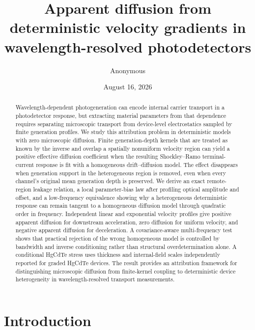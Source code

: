 \documentclass[aps,pra,twocolumn,superscriptaddress,nofootinbib]{revtex4-2}
\begin{document}
\title{Apparent diffusion from deterministic velocity gradients in wavelength-resolved photodetectors}

\author{Anonymous}

\date{August 16, 2026}

\begin{abstract}
Wavelength-dependent photogeneration can encode internal carrier transport in a photodetector response, but extracting material parameters from that dependence requires separating microscopic transport from device-level electrostatics sampled by finite generation profiles. We study this attribution problem in deterministic models with zero microscopic diffusion. Finite generation-depth kernels that are treated as known by the inverse and overlap a spatially nonuniform velocity region can yield a positive effective diffusion coefficient when the resulting Shockley--Ramo terminal-current response is fit with a homogeneous drift--diffusion model. The effect disappears when generation support in the heterogeneous region is removed, even when every channel's original mean generation depth is preserved. We derive an exact remote-region leakage relation, a local parameter-bias law after profiling optical amplitude and offset, and a low-frequency equivalence showing why a heterogeneous deterministic response can remain tangent to a homogeneous diffusion model through quadratic order in frequency. Independent linear and exponential velocity profiles give positive apparent diffusion for downstream acceleration, zero diffusion for uniform velocity, and negative apparent diffusion for deceleration. A covariance-aware multi-frequency test shows that practical rejection of the wrong homogeneous model is controlled by bandwidth and inverse conditioning rather than structural overdetermination alone. A conditional HgCdTe stress uses thickness and internal-field scales independently reported for graded HgCdTe devices. The result provides an attribution framework for distinguishing microscopic diffusion from finite-kernel coupling to deterministic device heterogeneity in wavelength-resolved transport measurements.
\end{abstract}

\maketitle

\section{Introduction}
\end{document}

